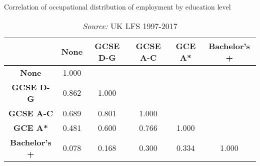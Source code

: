\begin{table}[h!]
	\centering
	\caption{Correlation of occupational distribution of employment by education level}
	\begin{tabular}{c|ccccc}
		& \textbf{None} & \textbf{GCSE D-G} & \textbf{GCSE A-C} & \textbf{GCE A*} & \textbf{Bachelor's +} \\
		\midrule
		\textbf{None} & 1.000 &       &       &       &  \\
		\textbf{GCSE D-G} & \cellcolor[rgb]{ .973,  .412,  .42}0.862 & 1.000 &       &       &  \\
		\textbf{GCSE A-C} & \cellcolor[rgb]{ .988,  .69,  .475}0.689 & \cellcolor[rgb]{ .98,  .51,  .439}0.801 & 1.000 &       &  \\
		\textbf{GCE A*} & \cellcolor[rgb]{ .918,  .898,  .51}0.481 & \cellcolor[rgb]{ .996,  .827,  .502}0.600 & \cellcolor[rgb]{ .984,  .565,  .451}0.766 & 1.000 &  \\
		\textbf{Bachelor's +} & \cellcolor[rgb]{ .388,  .745,  .482}0.078 & \cellcolor[rgb]{ .506,  .776,  .486}0.168 & \cellcolor[rgb]{ .678,  .827,  .498}0.300 & \cellcolor[rgb]{ .725,  .839,  .498}0.334 & 1.000 \\
	\end{tabular}%
	\caption*{\footnotesize\textit{Source:} UK LFS 1997-2017}
\end{table}%
